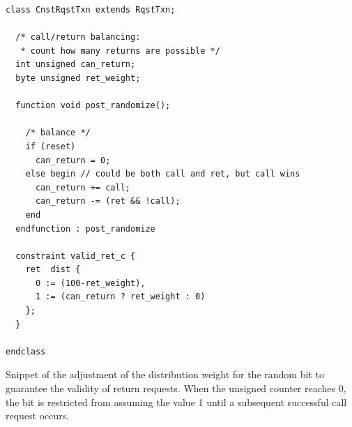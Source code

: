 \begin{listing}
\begin{verbatim}
class CnstRqstTxn extends RqstTxn;

  /* call/return balancing:
   * count how many returns are possible */
  int unsigned can_return;
  byte unsigned ret_weight;

  function void post_randomize();

    /* balance */
    if (reset)
      can_return = 0;
    else begin // could be both call and ret, but call wins
      can_return += call;
      can_return -= (ret && !call);
    end
  endfunction : post_randomize

  constraint valid_ret_c {
    ret  dist {
      0 := (100-ret_weight),
      1 := (can_return ? ret_weight : 0)
    };
  }

endclass
\end{verbatim}
\caption{Snippet of the adjustment of the distribution weight for the random bit  to guarantee the validity of return requests. When the unsigned counter  reaches 0, the  bit is restricted from assuming the value 1 until a subsequent successful call request occurs.}
\label{list:wrf_cnst}
\end{listing}

